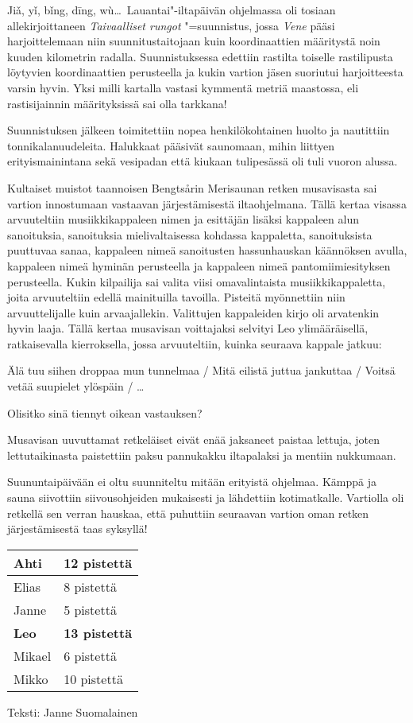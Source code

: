 \begin{multicols}{2}
Jiǎ, yǐ, bǐng, dīng, wù\ldots\ Lauantai"-iltapäivän ohjelmassa oli tosiaan allekirjoittaneen \textit{Taivaalliset rungot} "=suunnistus, jossa \textit{Vene} pääsi harjoittelemaan niin suunnitustaitojaan kuin koordinaattien määritystä noin kuuden kilometrin radalla. Suunnistuksessa edettiin rastilta toiselle rastilipusta löytyvien koordinaattien perusteella ja kukin vartion jäsen suoriutui harjoitteesta varsin hyvin. Yksi milli kartalla vastasi kymmentä metriä maastossa, eli rastisijainnin määrityksissä sai olla tarkkana!

Suunnistuksen jälkeen toimitettiin nopea henkilökohtainen huolto ja nautittiin tonnikalanuudeleita. Halukkaat pääsivät saunomaan, mihin liittyen erityismainintana sekä vesipadan että kiukaan tulipesässä oli tuli vuoron alussa.

Kultaiset muistot taannoisen Bengtsårin Merisaunan retken musavisasta sai vartion innostumaan vastaavan järjestämisestä iltaohjelmana. Tällä kertaa visassa arvuuteltiin musiikkikappaleen nimen ja esittäjän lisäksi kappaleen alun sanoituksia, sanoituksia mielivaltaisessa kohdassa kappaletta, sanoituksista puuttuvaa sanaa, kappaleen nimeä sanoitusten hassunhauskan käännöksen avulla, kappaleen nimeä hyminän perusteella ja kappaleen nimeä pantomiimiesityksen perusteella. Kukin kilpailija sai valita viisi omavalintaista musiikkikappaletta, joita arvuuteltiin edellä mainituilla tavoilla. Pisteitä myönnettiin niin arvuuttelijalle kuin arvaajallekin. Valittujen kappaleiden kirjo oli arvatenkin hyvin laaja. Tällä kertaa musavisan voittajaksi selvityi Leo ylimääräisellä, ratkaisevalla kierroksella, jossa arvuuteltiin, kuinka seuraava kappale jatkuu: 

Älä tuu siihen droppaa mun tunnelmaa / Mitä eilistä juttua jankuttaa / Voitsä vetää suupielet ylöspäin / \ldots

Olisitko sinä tiennyt oikean vastauksen?

Musavisan uuvuttamat retkeläiset eivät enää jaksaneet paistaa lettuja, joten lettutaikinasta paistettiin paksu pannukakku iltapalaksi ja mentiin nukkumaan.

Suununtaipäivään ei oltu suunniteltu mitään erityistä ohjelmaa. Kämppä ja sauna siivottiin siivousohjeiden mukaisesti ja lähdettiin kotimatkalle. Vartiolla oli retkellä sen verran hauskaa, että puhuttiin seuraavan vartion oman retken järjestämisestä taas syksyllä!


\begin{center}
\begin{tabular}{ |l|l| }
	\hline
	Ahti & 12 pistettä \\
	\hline
	Elias & 8 pistettä \\
	\hline
	Janne & 5 pistettä \\
	\hline
	\textbf{Leo} & \textbf{13 pistettä} \\
	\hline
	Mikael & 6 pistettä \\
	\hline
	Mikko & 10 pistettä \\
	\hline
\end{tabular}
\end{center}


{\raggedleft Teksti: Janne Suomalainen\par}

\end{multicols}

